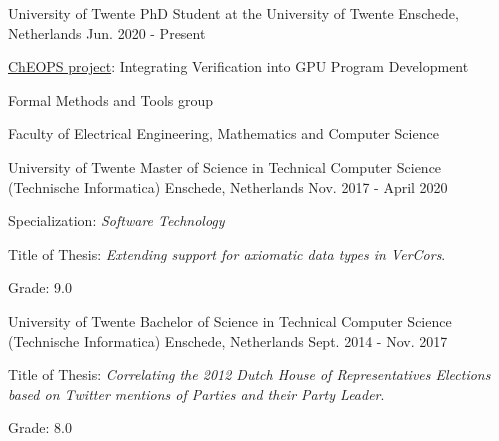 
\begin{cventries}


\cventry
{University of Twente} %
{PhD Student at the University of Twente } %
{Enschede, Netherlands} %
{Jun. 2020 - Present} %
{
	\begin{cvitems} %
		\item \href{https://cheops.win.tue.nl}{ChEOPS project}: Integrating Verification into GPU Program Development
		\item Formal Methods and Tools group
		\item Faculty of Electrical Engineering, Mathematics and Computer Science 
	\end{cvitems}
}


\cventry
{University of Twente} %
{Master of Science in Technical Computer Science (Technische Informatica)} %
{Enschede, Netherlands} %
{Nov. 2017 - April 2020} %
{
	\begin{cvitems} %
		\item Specialization: \textit{Software Technology}
        \item {Title of Thesis: \textit{Extending support for axiomatic data types in VerCors}.} 
		\item Grade: 9.0		
	\end{cvitems}
}

\cventry
{University of Twente} %
{Bachelor of Science in Technical Computer Science (Technische Informatica)} %
{Enschede, Netherlands} %
{Sept. 2014 - Nov. 2017} %
{
  \begin{cvitems} %
    \item {Title of Thesis: \textit{Correlating the 2012 Dutch House of Representatives Elections based on Twitter mentions of Parties and their Party Leader}.}
    \item Grade: 8.0
  \end{cvitems}
}
\end{cventries}
